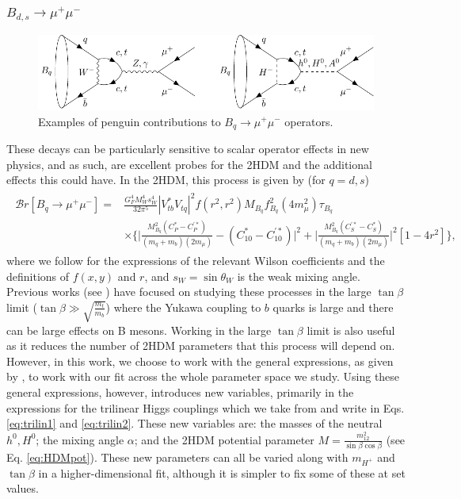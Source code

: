 \documentclass[a4paper,12pt]{article}
\begin{document}
\subsubsection{$B_{d,s}\to\mu^+\mu^-$}
\begin{figure}[ht]
    \centering
    \includegraphics[width=\textwidth]{bsmu.pdf}
    \caption{\label{fig:bspeng}Examples of penguin contributions to $B_q\to\mu^+\mu^-$ operators.}
\end{figure}
These decays can be particularly sensitive to scalar operator effects in new physics, and as such, are excellent probes for the 2HDM and the additional effects this could have. 
In the 2HDM, this process is given by (for $q=d,s$)
\begin{align}
    \begin{split}
        \mathcal{B}r[B_{q}\to\mu^+\mu^-] = &\frac{G^4_FM_W^4s_W^4}{32\pi^5}|V_{tb}^*V_{tq}|^2f(r^2,r^2)M_{B_q}f_{B_q}^2(4m_\mu^2)\tau_{B_q} \\
                                           &\times\Bigg\{\bigg|\frac{M_{B_q}^2(C_P^*-C_P^{'*})}{(m_q+m_b)(2m_\mu)}-(C_{10}^*-C_{10}^{'*})\bigg|^2 +\bigg|\frac{M_{B_q}^2(C_S^{'*}-C_S^*)}{(m_q+m_b)(2m_\mu)}\bigg|^2\left[1-4r^2\right]\Bigg\},
    \end{split}
\end{align}
where we follow \cite{criv} for the expressions of the relevant Wilson coefficients and the definitions of $f(x,y)$ and $r$, and $s_W=\sin\theta_W$ is the weak mixing angle. 
Previous works (see \cite{lrgtb}) have focused on studying these processes in the large $\tan\beta$ limit ($\tan\beta\gg\sqrt{\frac{m_t}{m_b}}$) where the Yukawa coupling to $b$ quarks is large and there can be large effects on B mesons. 
Working in the large $\tan\beta$ limit is also useful as it reduces the number of 2HDM parameters that this process will depend on. 
However, in this work, we choose to work with the general expressions, as given by \cite{criv}, to work with our fit across the whole parameter space we study. 
Using these general expressions, however, introduces new variables, primarily in the expressions for the trilinear Higgs couplings which we take from \cite{trilin} and write in Eqs. \ref{eq:trilin1} and \ref{eq:trilin2}.
These new variables are: the masses of the neutral $h^0,H^0$; the mixing angle $\alpha$; and the 2HDM potential parameter $M=\frac{m_{12}^2}{\sin\beta\cos\beta}$ (see Eq. \ref{eq:HDMpot}). 
These new parameters can all be varied along with $m_{H^+}$ and $\tan\beta$ in a higher-dimensional fit, although it is simpler to fix some of these at set values. 
\end{document}
